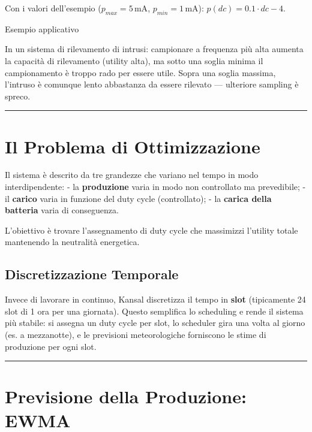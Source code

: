 \documentclass[
  italian,
  openany]{book}
\begin{document}
Con i valori dell'esempio (\(p_{max} = 5\,\text{mA}\),
\(p_{min} = 1\,\text{mA}\)): \(p(dc) = 0.1 \cdot dc - 4\).

\begin{callouttip}{Esempio applicativo}

In un sistema di rilevamento di intrusi: campionare a frequenza più alta
aumenta la capacità di rilevamento (utility alta), ma sotto una soglia
minima il campionamento è troppo rado per essere utile. Sopra una soglia
massima, l'intruso è comunque lento abbastanza da essere rilevato ---
ulteriore sampling è spreco.

\end{callouttip}

\begin{center}\rule{0.5\linewidth}{0.5pt}\end{center}

\section{Il Problema di
Ottimizzazione}\label{il-problema-di-ottimizzazione}

Il sistema è descrito da tre grandezze che variano nel tempo in modo
interdipendente: - la \textbf{produzione} varia in modo non controllato
ma prevedibile; - il \textbf{carico} varia in funzione del duty cycle
(controllato); - la \textbf{carica della batteria} varia di conseguenza.

L'obiettivo è trovare l'assegnamento di duty cycle che massimizzi
l'utility totale mantenendo la neutralità energetica.

\subsection{Discretizzazione
Temporale}\label{discretizzazione-temporale}

Invece di lavorare in continuo, Kansal discretizza il tempo in
\textbf{slot} (tipicamente 24 slot di 1 ora per una giornata). Questo
semplifica lo scheduling e rende il sistema più stabile: si assegna un
duty cycle per slot, lo scheduler gira una volta al giorno (es. a
mezzanotte), e le previsioni meteorologiche forniscono le stime di
produzione per ogni slot.

\begin{center}\rule{0.5\linewidth}{0.5pt}\end{center}

\section{Previsione della Produzione:
EWMA}\label{previsione-della-produzione-ewma}
\end{document}
